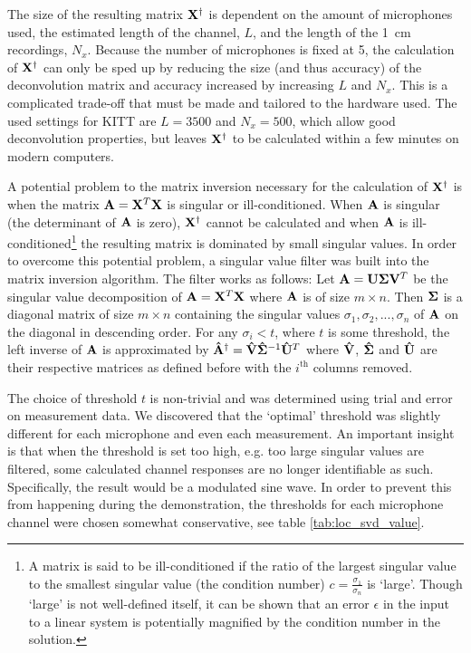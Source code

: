 \documentclass[11pt,titlepage]{report}
\begin{document}
The size of the resulting matrix $\mathbf{X}^\dagger$ is dependent on the amount of microphones used, the estimated length of the channel, $L$, and the length of the \SI{1}{cm} recordings, $N_x$. Because the number of microphones is fixed at \num{5}, the calculation of $\mathbf{X}^\dagger$ can only be sped up by reducing the size (and thus accuracy) of the deconvolution matrix and accuracy increased by increasing $L$ and $N_x$. This is a complicated trade-off that must be made and tailored to the hardware used. The used settings for KITT are $L=3500$ and $N_x=500$, which allow good deconvolution properties, but leaves $\mathbf{X}^\dagger$ to be calculated within a few minutes on modern computers.

A potential problem to the matrix inversion necessary for the calculation of $\mathbf{X}^\dagger$ is when the matrix $\mathbf{A}=\mathbf{X}^T\mathbf{X}$ is singular or ill-conditioned. When $\mathbf{A}$ is singular (the determinant of $\mathbf{A}$ is zero), $\mathbf{X}^\dagger$ cannot be calculated and when $\mathbf{A}$ is ill-conditioned\footnote{A matrix is said to be ill-conditioned if the ratio of the largest singular value to the smallest singular value (the condition number) $c=\frac{\sigma_1}{\sigma_n}$ is `large'. Though `large' is not well-defined itself, it can be shown \cite{epo4-manual} that an error $\epsilon$ in the input to a linear system is potentially magnified by the condition number in the solution.} the resulting matrix is dominated by small singular values. In order to overcome this potential problem, a singular value filter was built into the matrix inversion algorithm. The filter works as follows:
Let $\mathbf{A}=\mathbf{U}\mathbf{\Sigma}\mathbf{V}^T$ be the singular value decomposition of $\mathbf{A}=\mathbf{X}^T\mathbf{X}$ where $\mathbf{A}$ is of size $m\times n$. Then $\mathbf{\Sigma}$ is a diagonal matrix of size $m \times n$ containing the singular values $\sigma_1, \sigma_2, ..., \sigma_n$ of $\mathbf{A}$ on the diagonal in descending order. For any $\sigma_i<t$, where $t$ is some threshold, the left inverse of $\mathbf{A}$ is approximated by $\mathbf{\hat{A}}^\dagger=\mathbf{\hat{V}}\mathbf{\hat{\Sigma}}^{-1}\mathbf{\hat{U}}^T$ where $\mathbf{\hat{V}}$, $\mathbf{\hat{\Sigma}}$ and $\mathbf{\hat{U}}$ are their respective matrices as defined before with the $i^\text{th}$ columns removed. 

The choice of threshold $t$ is non-trivial and was determined using trial and error on measurement data. We discovered that the `optimal' threshold was slightly different for each microphone and even each measurement. An important insight is that when the threshold is set too high, e.g. too large singular values are filtered, some calculated channel responses are no longer identifiable as such. Specifically, the result would be a modulated sine wave. In order to prevent this from happening during the demonstration, the thresholds for each microphone channel were chosen somewhat conservative, see table \ref{tab:loc_svd_value}.
\end{document}
